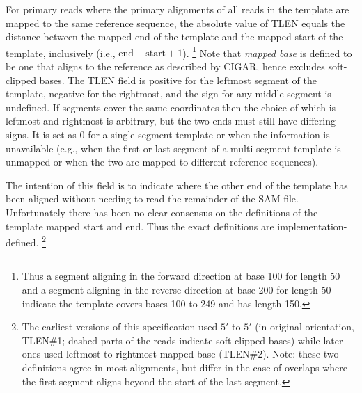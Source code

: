 \documentclass[10pt]{article}
\begin{document}
\begin{enumerate}
  For primary reads where the primary alignments of all reads in the template
  are mapped to the same reference sequence, the absolute value of TLEN
  equals the distance between the mapped end of the template and the
  mapped start of the template, inclusively (i.e., $\mbox{end}-\mbox{start}+1$).%
  \footnote{Thus a segment
    aligning in the forward direction at base 100 for length 50 and a
    segment aligning in the reverse direction at base 200 for length
    50 indicate the template covers bases 100 to 249 and has length
    150.}
  Note that \textit{mapped base} is defined to be one that aligns to the
  reference as described by CIGAR, hence excludes soft-clipped bases.
  The TLEN field is positive for the leftmost segment of the template,
  negative for the rightmost, and the sign for any middle segment is
  undefined.  If segments cover the same coordinates then the choice
  of which is leftmost and rightmost is arbitrary, but the two ends
  must still have differing signs.
  It is set as 0 for a single-segment template or when the
  information is unavailable (e.g., when the first or last segment
  of a multi-segment template is unmapped or when the two are mapped
  to different reference sequences).

  The intention of this field is to indicate where the other end of
  the template has been aligned without needing to read the remainder
  of the SAM file.  Unfortunately there has been no
  clear consensus on the definitions of the template mapped start
  and end.  Thus the exact definitions are implementation-defined.%
\footnote{The earliest versions of this specification used $5'$ to
  $5'$ (in original orientation, TLEN\#1; dashed parts of the reads
  indicate soft-clipped bases) while later ones used leftmost to
  rightmost mapped base (TLEN\#2).  Note: these two definitions agree in most
  alignments, but differ in the case of overlaps where the first
  segment aligns beyond the start of the last segment.

}
\end{enumerate}
\end{document}
